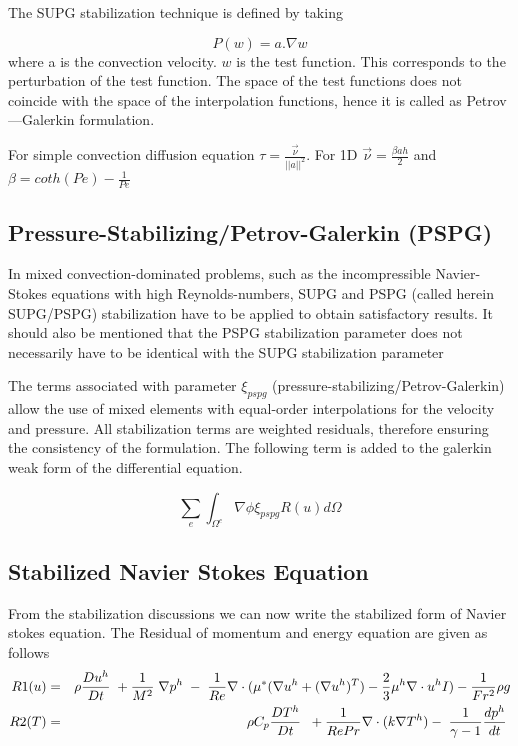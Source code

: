 \bigskip
\noindent The SUPG stabilization technique is defined by taking


$$P(w)= a.\nabla w$$ \noindent where a is the convection velocity. $w$ is the test function.  This corresponds to the perturbation of the test function. The space of the test functions does not coincide with the space of the interpolation functions, hence it is called as Petrov—Galerkin formulation.

\noindent For simple convection diffusion equation
\bigskip
 $\tau = \frac{\overrightarrow{\nu}}{\vert \vert a \vert\vert^2}$. For 1D $\overrightarrow{\nu}=\frac{\beta a h}{2}$ and $\beta = coth(Pe)-\frac{1}{Pe}$
 
 \subsection{Pressure-Stabilizing/Petrov-Galerkin (PSPG)} 
 
 In mixed convection-dominated problems, such as the incompressible Navier-Stokes equations
 with high Reynolds-numbers, SUPG and PSPG (called herein SUPG/PSPG) stabilization have to
 be applied to obtain satisfactory results. It should also be mentioned that the PSPG stabilization parameter does not necessarily have to be identical with the SUPG stabilization parameter
 
 \bigskip
 \noindent The terms associated with parameter $\xi_{pspg}$ (pressure-stabilizing/Petrov-Galerkin)
 allow the use of mixed elements with equal-order interpolations for the velocity and
 pressure. All stabilization
 terms are weighted residuals, therefore ensuring the consistency of the formulation. The following term is added to the galerkin weak form of the differential equation. 
 
  $$\sum_e \int_{\Omega^e} \nabla \phi \xi_{pspg} R(u)  d\Omega$$ 
 
 \subsection{Stabilized Navier Stokes Equation} 
\noindent From the stabilization discussions we can now write the stabilized form of Navier stokes equation. The Residual of momentum and energy equation are given as follows
\bigskip
\begin{eqnarray*}
R1(u) &=& \rho \frac{D u^h}{D t} \hspace{1mm} + \frac{1}{M^2}\hspace{1mm}\nabla p^h\hspace{1mm}-\hspace{1mm}\frac{1}{Re}\nabla \cdot (\mu^*(\nabla u^h +(\nabla u^h)^T) - \frac{2}{3}\mu^h \nabla \cdot u^h I) - \frac{1}{Fr^2}\rho g \\
R2(T) &=& \rho C_p \frac{D T^h}{D t} \hspace{1mm} \hspace{1mm} + \frac{1}{Re Pr}\nabla\cdot (k \nabla T^h) - \hspace{1mm} \frac{1}{\gamma -1} \frac{d p^h}{d t}\hspace{1mm}
\end{eqnarray*}

